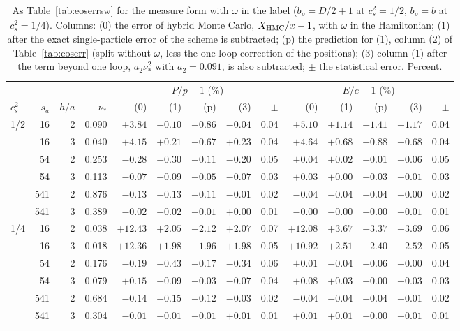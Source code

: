 \documentclass[11pt,aps,preprint,nofootinbib,superscriptaddress,tightenlines]{revtex4-2}
\def\Tab#1{Table~\ref{#1}}
\begin{document}
\begin{table}[h]
\caption{As \Tab{tab:eoserrsw} for the measure form with $\omega$ in the label ($b_\rho=D/2+1$ at $c_s^2=1/2$, $b_\rho=b$ at $c_s^2=1/4$).  Columns: (0) the error of hybrid Monte Carlo, $X_{\rm HMC}/x-1$, with $\omega$ in the Hamiltonian; (1) after the exact
single-particle error of the scheme is subtracted; (p) the prediction for (1), column (2) of \Tab{tab:eoserr} (split without $\omega$, less the one-loop
correction of the positions); (3) column (1) after the term beyond one loop, $a_2\nu_*^2$ with $a_2=0.091$, is also subtracted; $\pm$ the
statistical error.  Percent.}
\label{tab:eoserrmw}
\begin{center}\small
\begin{tabular}{lrrr|rrrrr|rrrrr}
\toprule
 & & & & \multicolumn{5}{c|}{$P/p-1$ (\%)} & \multicolumn{5}{c}{$E/e-1$ (\%)} \\
$c_s^2$ & $s_a$ & $h/a$ & $\nu_*$ & (0) & (1) & (p) & (3) & $\pm$ & (0) & (1) & (p) & (3) & $\pm$ \\
\midrule
1/2 & 16 & 2 & 0.090 & $+3.84$ & $-0.10$ & $+0.86$ & $-0.04$ & 0.04 & $+5.10$ & $+1.14$ & $+1.41$ & $+1.17$ & 0.04 \\
 & 16 & 3 & 0.040 & $+4.15$ & $+0.21$ & $+0.67$ & $+0.23$ & 0.04 & $+4.64$ & $+0.68$ & $+0.88$ & $+0.68$ & 0.04 \\
 & 54 & 2 & 0.253 & $-0.28$ & $-0.30$ & $-0.11$ & $-0.20$ & 0.05 & $+0.04$ & $+0.02$ & $-0.01$ & $+0.06$ & 0.05 \\
 & 54 & 3 & 0.113 & $-0.07$ & $-0.09$ & $-0.05$ & $-0.07$ & 0.03 & $+0.03$ & $+0.00$ & $-0.03$ & $+0.01$ & 0.03 \\
 & 541 & 2 & 0.876 & $-0.13$ & $-0.13$ & $-0.11$ & $-0.01$ & 0.02 & $-0.04$ & $-0.04$ & $-0.04$ & $-0.00$ & 0.02 \\
 & 541 & 3 & 0.389 & $-0.02$ & $-0.02$ & $-0.01$ & $+0.00$ & 0.01 & $-0.00$ & $-0.00$ & $-0.00$ & $+0.01$ & 0.01 \\
\midrule
1/4 & 16 & 2 & 0.038 & $+12.43$ & $+2.05$ & $+2.12$ & $+2.07$ & 0.07 & $+12.08$ & $+3.67$ & $+3.37$ & $+3.69$ & 0.06 \\
 & 16 & 3 & 0.018 & $+12.36$ & $+1.98$ & $+1.96$ & $+1.98$ & 0.05 & $+10.92$ & $+2.51$ & $+2.40$ & $+2.52$ & 0.05 \\
 & 54 & 2 & 0.176 & $-0.19$ & $-0.43$ & $-0.17$ & $-0.34$ & 0.06 & $+0.01$ & $-0.04$ & $-0.06$ & $-0.00$ & 0.04 \\
 & 54 & 3 & 0.079 & $+0.15$ & $-0.09$ & $-0.03$ & $-0.07$ & 0.04 & $+0.08$ & $+0.03$ & $-0.00$ & $+0.03$ & 0.03 \\
 & 541 & 2 & 0.684 & $-0.14$ & $-0.15$ & $-0.12$ & $-0.03$ & 0.02 & $-0.04$ & $-0.04$ & $-0.04$ & $-0.01$ & 0.02 \\
 & 541 & 3 & 0.304 & $-0.01$ & $-0.01$ & $-0.01$ & $+0.01$ & 0.01 & $+0.01$ & $+0.01$ & $+0.00$ & $+0.01$ & 0.01 \\
\bottomrule
\end{tabular}
\end{center}
\end{table}
\end{document}
